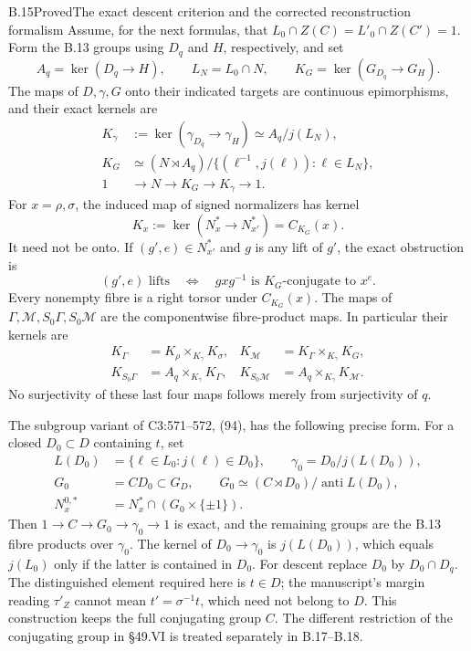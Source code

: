 \begin{statement}{B.15}{Proved}{The exact descent criterion and the corrected reconstruction formalism}
Assume, for the next formulas, that
\(L_0\cap Z(C)=L'_0\cap Z(C')=1\). Form the B.13 groups using
\(D_q\) and \(H\), respectively, and set
\[
 A_q=\ker(D_q\to H),\qquad L_N=L_0\cap N,
 \qquad K_G=\ker(G_{D_q}\to G_H).
\]
The maps of \(D,\gamma,G\) onto their indicated targets are
continuous epimorphisms, and their exact kernels are
\[
\begin{split}
 K_\gamma&:=\ker(\gamma_{D_q}\to\gamma_H)
                  \simeq A_q/j(L_N),\\
 K_G&\simeq (N\rtimes A_q)/
       \{(\ell^{-1},j(\ell)):\ell\in L_N\},\\
 1&\longrightarrow N\longrightarrow K_G
          \longrightarrow K_\gamma\longrightarrow1.
\end{split}
\tag{B.15.2}
\]
For \(x=\rho,\sigma\), the induced map of signed normalizers has
kernel
\[
 K_x:=\ker(N_x^*\to N_{x'}^*)=C_{K_G}(x).
 \tag{B.15.3}
\]
It need not be onto. If \((g',e)\in N_{x'}^*\) and \(g\) is any
lift of \(g'\), the exact obstruction is
\[
 (g',e)\text{ lifts}\quad\Longleftrightarrow\quad
 gxg^{-1}\text{ is }K_G\text{-conjugate to }x^e.
 \tag{B.15.4}
\]
Every nonempty fibre is a right torsor under \(C_{K_G}(x)\).
The maps of \(\Gamma,\mathcal M,S_0\Gamma,S_0\mathcal M\) are the
componentwise fibre-product maps. In particular their kernels are
\[
\begin{aligned}
 K_\Gamma&=K_\rho\times_{K_\gamma}K_\sigma,&
 K_{\mathcal M}&=K_\Gamma\times_{K_\gamma}K_G,\\
 K_{S_0\Gamma}&=A_q\times_{K_\gamma}K_\Gamma,&
 K_{S_0\mathcal M}&=A_q\times_{K_\gamma}K_{\mathcal M}.
\end{aligned}
\tag{B.15.5}
\]
No surjectivity of these last four maps follows merely from
surjectivity of \(q\).

The subgroup variant of C3:571--572, (94), has the following precise
form. For a closed \(D_0\subset D\) containing \(t\), set
\[
\begin{split}
 L(D_0)&=\{\ell\in L_0:j(\ell)\in D_0\},\qquad
 \gamma_0=D_0/j(L(D_0)),\\
 G_0&=CD_0\subset G_D,\qquad
 G_0\simeq(C\rtimes D_0)/\operatorname{anti}L(D_0),\\
 N_x^{0,*}&=N_x^*\cap(G_0\times\{\pm1\}).
\end{split}
\tag{B.15.6}
\]
Then \(1\to C\to G_0\to\gamma_0\to1\) is exact, and the
remaining groups are the B.13 fibre products over \(\gamma_0\).
The kernel of \(D_0\to\gamma_0\) is \(j(L(D_0))\), which equals
\(j(L_0)\) only if the latter is contained in \(D_0\).
For descent replace \(D_0\) by \(D_0\cap D_q\).
The distinguished element required here is \(t\in D\); the
manuscript's margin reading \(\tau'_Z\) cannot mean
\(t'=\sigma^{-1}t\), which need not belong to \(D\).
This construction keeps the full conjugating group \(C\). The
different restriction of the conjugating group in \S49.VI is
treated separately in B.17--B.18.


\end{statement}
